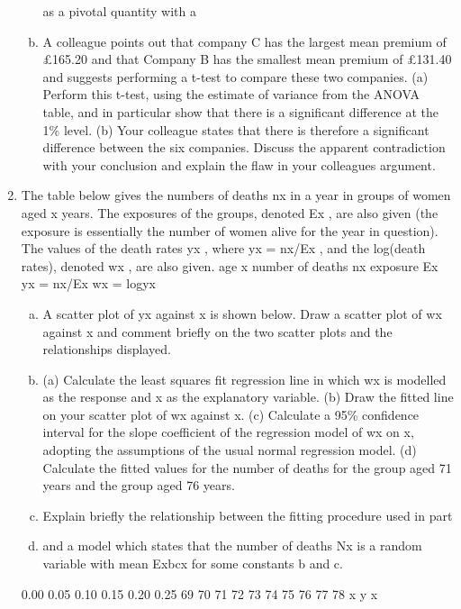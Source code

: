 \documentclass[a4paper,12pt]{article}
\begin{document}
\begin{enumerate}
\begin{enumerate}[(a)]
as a pivotal quantity with a %
\item A colleague points out that company C has the largest mean premium of
£165.20 and that Company B has the smallest mean premium of £131.40 and
suggests performing a t-test to compare these two companies.
(a) Perform this t-test, using the estimate of variance from the ANOVA
table, and in particular show that there is a significant difference at the
1\% level.
(b) Your colleague states that there is therefore a significant difference
between the six companies.
Discuss the apparent contradiction with your conclusion and
explain the flaw in your colleagues argument. 
\end{enumerate}
\item The table below gives the numbers of deaths nx in a year in groups of women aged x
years. The exposures of the groups, denoted Ex , are also given (the exposure is
essentially the number of women alive for the year in question). The values of the
death rates yx , where yx = nx/Ex , and the log(death rates), denoted wx , are also given.
age x number of deaths nx exposure Ex yx = nx/Ex wx = logyx
\begin{enumerate}[(a)]
\item A scatter plot of yx against x is shown below.
Draw a scatter plot of wx against x and comment briefly on the two scatter
plots and the relationships displayed. 
\item (a) Calculate the least squares fit regression line in which wx is modelled
as the response and x as the explanatory variable.
(b) Draw the fitted line on your scatter plot of wx against x.
(c) Calculate a 95\% confidence interval for the slope coefficient of the
regression model of wx on x, adopting the assumptions of the usual
normal regression model.
(d) Calculate the fitted values for the number of deaths for the group aged
71 years and the group aged 76 years. 
\item Explain briefly the relationship between the fitting procedure used in part \item
and a model which states that the number of deaths Nx is a random variable
with mean Exbcx for some constants b and c. 
\end{enumerate}
0.00
0.05
0.10
0.15
0.20
0.25
69 70 71 72 73 74 75 76 77 78
x
y x


\end{enumerate}
\end{document}
